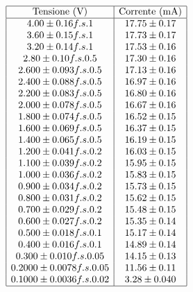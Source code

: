 \documentclass[a4paper,11pt]{article}
\begin{document}
\begin{minipage}{0.4\textwidth}
        \[
\begin{array}{|c|c|}
\hline
\text{Tensione (V)} & \text{Corrente (mA)}
\\ \hline
4.00 \pm 0.16 f.s. 1 & 17.75 \pm 0.17 \\ 
3.60 \pm 0.15 f.s. 1 & 17.73 \pm 0.17 \\ 
3.20 \pm 0.14 f.s. 1 & 17.53 \pm 0.16 \\ 
2.80 \pm 0.10 f.s. 0.5 & 17.30 \pm 0.16 \\ 
2.600 \pm 0.093 f.s. 0.5 & 17.13 \pm 0.16 \\ 
2.400 \pm 0.088 f.s. 0.5 & 16.97 \pm 0.16 \\ 
2.200 \pm 0.083 f.s. 0.5 & 16.80 \pm 0.16 \\ 
2.000 \pm 0.078 f.s. 0.5 & 16.67 \pm 0.16 \\ 
1.800 \pm 0.074 f.s. 0.5 & 16.52 \pm 0.15 \\ 
1.600 \pm 0.069 f.s. 0.5 & 16.37 \pm 0.15 \\ 
1.400 \pm 0.065 f.s. 0.5 & 16.19 \pm 0.15 \\ 
1.200 \pm 0.041 f.s. 0.2 & 16.03 \pm 0.15 \\ 
1.100 \pm 0.039 f.s. 0.2 & 15.95 \pm 0.15 \\ 
1.000 \pm 0.036 f.s. 0.2 & 15.83 \pm 0.15 \\ 
0.900 \pm 0.034 f.s. 0.2 & 15.73 \pm 0.15 \\ 
0.800 \pm 0.031 f.s. 0.2 & 15.62 \pm 0.15 \\ 
0.700 \pm 0.029 f.s. 0.2 & 15.48 \pm 0.15 \\ 
0.600 \pm 0.027 f.s. 0.2 & 15.35 \pm 0.14 \\ 
0.500 \pm 0.018 f.s. 0.1 & 15.17 \pm 0.14 \\ 
0.400 \pm 0.016 f.s. 0.1 & 14.89 \pm 0.14 \\ 
0.300 \pm 0.010 f.s. 0.05 & 14.15 \pm 0.13 \\ 
0.2000 \pm 0.0078 f.s. 0.05 & 11.56 \pm 0.11 \\ 
0.1000 \pm 0.0036 f.s. 0.02 & 3.28 \pm 0.040 \\
\hline
\end{array} \label{tab::dati_100}
\]
    \end{minipage}
    \hfill %
\end{document}
